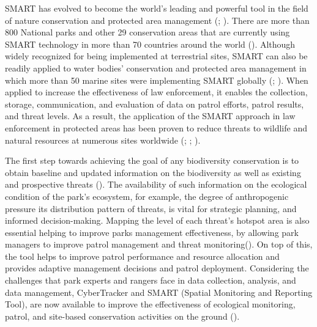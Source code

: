 \documentclass[
  letterpaper,
  DIV=11,
  numbers=noendperiod]{scrartcl}
\begin{document}
SMART has evolved to become the world's leading and powerful tool in the
field of nature conservation and protected area management
(;
). There are more than 800
National parks and other 29 conservation areas that are currently using
SMART technology in more than 70 countries around the world
(). Although
widely recognized for being implemented at terrestrial sites, SMART can
also be readily applied to water bodies' conservation and protected area
management in which more than 50 marine sites were implementing SMART
globally (;
). When applied to increase the
effectiveness of law enforcement, it enables the collection, storage,
communication, and evaluation of data on patrol efforts, patrol results,
and threat levels. As a result, the application of the SMART approach in
law enforcement in protected areas has been proven to reduce threats to
wildlife and natural resources at numerous sites worldwide
(;
;
).

The first step towards achieving the goal of any biodiversity
conservation is to obtain baseline and updated information on the
biodiversity as well as existing and prospective threats
(). The availability of
such information on the ecological condition of the park's ecosystem,
for example, the degree of anthropogenic pressure its distribution
pattern of threats, is vital for strategic planning, and informed
decision-making. Mapping the level of each threat's hotspot area is also
essential helping to improve parks management effectiveness, by allowing
park managers to improve patrol management and threat
monitoring(). On top of
this, the tool helps to improve patrol performance and resource
allocation and provides adaptive management decisions and patrol
deployment. Considering the challenges that park experts and rangers
face in data collection, analysis, and data management, CyberTracker and
SMART (Spatial Monitoring and Reporting Tool), are now available to
improve the effectiveness of ecological monitoring, patrol, and
site-based conservation activities on the ground
().
\end{document}
